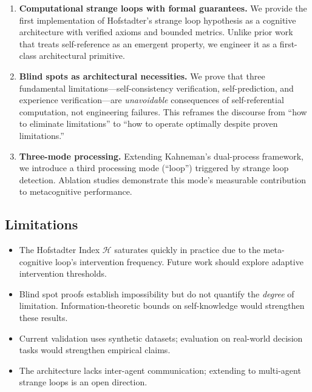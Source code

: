 \documentclass[11pt,a4paper]{article}
\newcommand{\HI}{\mathcal{H}}  %
\begin{document}
\begin{enumerate}
  \item \textbf{Computational strange loops with formal guarantees.}
        We provide the first implementation of Hofstadter's strange
        loop hypothesis as a cognitive architecture with verified
        axioms and bounded metrics. Unlike prior work that treats
        self-reference as an emergent property, we engineer it as
        a first-class architectural primitive.

  \item \textbf{Blind spots as architectural necessities.}
        We prove that three fundamental limitations---self-consistency
        verification, self-prediction, and experience verification---are
        \emph{unavoidable} consequences of self-referential
        computation, not engineering failures. This reframes the
        discourse from ``how to eliminate limitations'' to ``how to
        operate optimally despite proven limitations.''

  \item \textbf{Three-mode processing.}
        Extending Kahneman's dual-process framework, we introduce a
        third processing mode (``loop'') triggered by strange loop
        detection. Ablation studies demonstrate this mode's measurable
        contribution to metacognitive performance.
\end{enumerate}

\subsection{Limitations}

\begin{itemize}
  \item The Hofstadter Index $\HI$ saturates quickly in practice due
        to the meta-cognitive loop's intervention frequency. Future
        work should explore adaptive intervention thresholds.
  \item Blind spot proofs establish impossibility but do not quantify
        the \emph{degree} of limitation. Information-theoretic bounds
        on self-knowledge would strengthen these results.
  \item Current validation uses synthetic datasets; evaluation on
        real-world decision tasks would strengthen empirical claims.
  \item The architecture lacks inter-agent communication; extending
        to multi-agent strange loops is an open direction.
\end{itemize}
\end{document}
